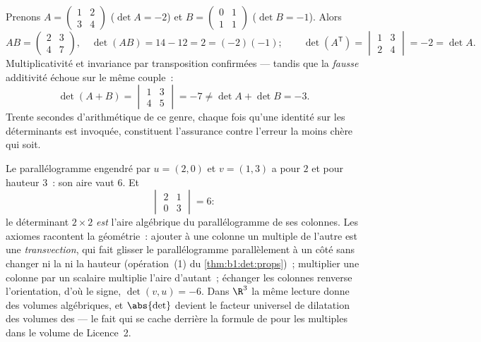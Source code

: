 \begin{example}
\label{ex:b1:det:rulescheck}
Prenons $A = \begin{pmatrix} 1 & 2\\ 3 & 4\end{pmatrix}$ ($\det A =
-2$) et $B = \begin{pmatrix} 0 & 1\\ 1 & 1\end{pmatrix}$ ($\det
B = -1$). Alors
\[
AB = \begin{pmatrix} 2 & 3\\ 4 & 7\end{pmatrix},
\quad \det(AB) = 14 - 12 = 2 = (-2)(-1) ;
\qquad
\det(A^{\mathsf T}) = \begin{vmatrix} 1 & 3\\ 2 & 4
\end{vmatrix} = -2 = \det A .
\]
Multiplicativité et invariance par transposition confirmées ---
tandis que la \emph{fausse} additivité échoue sur le même couple~:
\[
\det(A + B) = \begin{vmatrix} 1 & 3\\ 4 & 5\end{vmatrix} = -7
\neq \det A + \det B = -3 .
\]
Trente secondes d'arithmétique de ce genre, chaque fois qu'une
identité sur les déterminants est invoquée, constituent l'assurance
contre l'erreur la moins chère qui soit.
\end{example}

\begin{example}
\label{ex:b1:det:area}
Le parallélogramme engendré par $u = (2, 0)$ et $v = (1, 3)$ a pour
 $2$ et pour hauteur $3$~: son aire vaut $6$. Et
\[
\begin{vmatrix} 2 & 1\\ 0 & 3\end{vmatrix} = 6 :
\]
le déterminant $2\times2$ \emph{est} l'aire algébrique du
parallélogramme de ses colonnes. Les axiomes racontent la géométrie~:
ajouter à une colonne un multiple de l'autre est une
\emph{transvection}, qui fait glisser le parallélogramme parallèlement
à un côté sans changer ni la  ni la hauteur (opération~(1) du
\cref{thm:b1:det:props})~; multiplier une colonne par un scalaire
multiplie l'aire d'autant~; échanger les colonnes renverse
l'orientation, d'où le signe, $\det(v, u) = -6$. Dans $\R^3$
la même lecture donne des volumes algébriques, et $\abs{\det}$ devient
le facteur universel de dilatation des volumes des  --- le fait qui se cache derrière la formule de  pour les  multiples dans le volume de
Licence~2.
\end{example}


